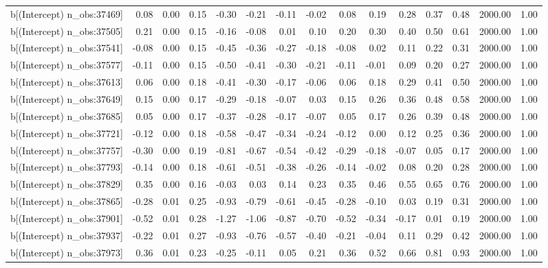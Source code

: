 \begin{table}[ht]
\begin{tabular}{rrrrrrrrrrrrrrr}
  b[(Intercept) n\_obs:37469] & 0.08 & 0.00 & 0.15 & -0.30 & -0.21 & -0.11 & -0.02 & 0.08 & 0.19 & 0.28 & 0.37 & 0.48 & 2000.00 & 1.00 \\ 
  b[(Intercept) n\_obs:37505] & 0.21 & 0.00 & 0.15 & -0.16 & -0.08 & 0.01 & 0.10 & 0.20 & 0.30 & 0.40 & 0.50 & 0.61 & 2000.00 & 1.00 \\ 
  b[(Intercept) n\_obs:37541] & -0.08 & 0.00 & 0.15 & -0.45 & -0.36 & -0.27 & -0.18 & -0.08 & 0.02 & 0.11 & 0.22 & 0.31 & 2000.00 & 1.00 \\ 
  b[(Intercept) n\_obs:37577] & -0.11 & 0.00 & 0.15 & -0.50 & -0.41 & -0.30 & -0.21 & -0.11 & -0.01 & 0.09 & 0.20 & 0.27 & 2000.00 & 1.00 \\ 
  b[(Intercept) n\_obs:37613] & 0.06 & 0.00 & 0.18 & -0.41 & -0.30 & -0.17 & -0.06 & 0.06 & 0.18 & 0.29 & 0.41 & 0.50 & 2000.00 & 1.00 \\ 
  b[(Intercept) n\_obs:37649] & 0.15 & 0.00 & 0.17 & -0.29 & -0.18 & -0.07 & 0.03 & 0.15 & 0.26 & 0.36 & 0.48 & 0.58 & 2000.00 & 1.00 \\ 
  b[(Intercept) n\_obs:37685] & 0.05 & 0.00 & 0.17 & -0.37 & -0.28 & -0.17 & -0.07 & 0.05 & 0.17 & 0.26 & 0.39 & 0.48 & 2000.00 & 1.00 \\ 
  b[(Intercept) n\_obs:37721] & -0.12 & 0.00 & 0.18 & -0.58 & -0.47 & -0.34 & -0.24 & -0.12 & 0.00 & 0.12 & 0.25 & 0.36 & 2000.00 & 1.00 \\ 
  b[(Intercept) n\_obs:37757] & -0.30 & 0.00 & 0.19 & -0.81 & -0.67 & -0.54 & -0.42 & -0.29 & -0.18 & -0.07 & 0.05 & 0.17 & 2000.00 & 1.00 \\ 
  b[(Intercept) n\_obs:37793] & -0.14 & 0.00 & 0.18 & -0.61 & -0.51 & -0.38 & -0.26 & -0.14 & -0.02 & 0.08 & 0.20 & 0.28 & 2000.00 & 1.00 \\ 
  b[(Intercept) n\_obs:37829] & 0.35 & 0.00 & 0.16 & -0.03 & 0.03 & 0.14 & 0.23 & 0.35 & 0.46 & 0.55 & 0.65 & 0.76 & 2000.00 & 1.00 \\ 
  b[(Intercept) n\_obs:37865] & -0.28 & 0.01 & 0.25 & -0.93 & -0.79 & -0.61 & -0.45 & -0.28 & -0.10 & 0.03 & 0.19 & 0.31 & 2000.00 & 1.00 \\ 
  b[(Intercept) n\_obs:37901] & -0.52 & 0.01 & 0.28 & -1.27 & -1.06 & -0.87 & -0.70 & -0.52 & -0.34 & -0.17 & 0.01 & 0.19 & 2000.00 & 1.00 \\ 
  b[(Intercept) n\_obs:37937] & -0.22 & 0.01 & 0.27 & -0.93 & -0.76 & -0.57 & -0.40 & -0.21 & -0.04 & 0.11 & 0.29 & 0.42 & 2000.00 & 1.00 \\ 
  b[(Intercept) n\_obs:37973] & 0.36 & 0.01 & 0.23 & -0.25 & -0.11 & 0.05 & 0.21 & 0.36 & 0.52 & 0.66 & 0.81 & 0.93 & 2000.00 & 1.00 \\ 

\end{tabular}
\end{table}
